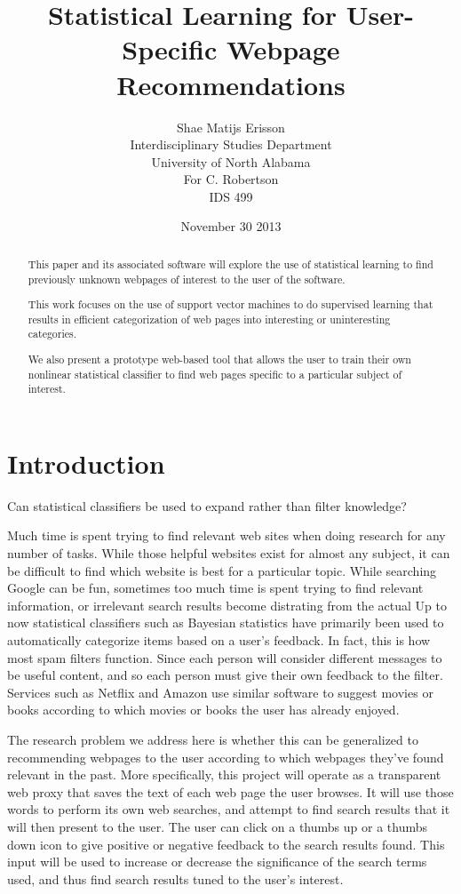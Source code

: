 \documentclass[12pt]{article}
\author{Shae Matijs Erisson\\Interdisciplinary Studies Department\\University of North Alabama\\For
  C. Robertson\\IDS 499}
\title{Statistical Learning for User-Specific Webpage Recommendations}
\date{November 30 2013}
\begin{document}
\maketitle{}
\pagebreak{}
\tableofcontents
\pagebreak{}
\begin{abstract}
  This paper and its associated software will explore the use of statistical learning to find previously
  unknown webpages of interest to the user of the software.

  This work focuses on the use of support vector machines to do supervised learning that results in efficient
  categorization of web pages into interesting or uninteresting categories.

  We also present a prototype web-based tool that allows the user to train their own nonlinear statistical
  classifier to find web pages specific to a particular subject of interest.
\end{abstract}

\pagebreak{}
\section{Introduction}
Can statistical classifiers be used to expand rather than filter knowledge?

Much time is spent trying to find relevant web sites when doing research for any number of tasks. While those
helpful websites exist for almost any subject, it can be difficult to find which website is best for a
particular topic. While searching Google can be fun, sometimes too much time is spent trying to find relevant
information, or irrelevant search results become distrating from the actual
Up to now statistical classifiers such as Bayesian statistics have primarily been used to automatically
categorize items based on a user's feedback. In fact, this is how most spam filters function. Since each
person will consider different messages to be useful content, and so each person must give their own feedback
to the filter. Services such as Netflix and Amazon use similar software to suggest movies or books according
to which movies or books the user has already enjoyed.

The research problem we address here is whether this can be generalized to recommending webpages to the user
according to which webpages they've found relevant in the past. More specifically, this project will operate
as a transparent web proxy that saves the text of each web page the user browses. It will use those words to
perform its own web searches, and attempt to find search results that it will then present to the user. The
user can click on a thumbs up or a thumbs down icon to give positive or negative feedback to the search
results found. This input will be used to increase or decrease the significance of the search terms used, and
thus find search results tuned to the user's interest.
\end{document}
